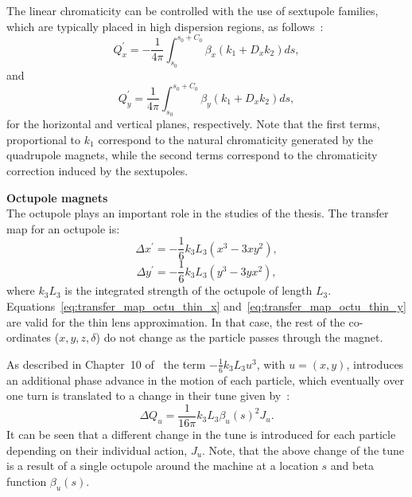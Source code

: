 The linear chromaticity can be controlled with the use of sextupole families,  which are typically placed in high dispersion regions, as follows~\cite{wolski2014}:%
\begin{equation}
    Q_x^\prime = -\frac{1}{4\pi}\int_{s_0}^{s_0+C_0}\beta_x(k_1+D_x k_2)ds,
\end{equation}
and
\begin{equation}
    Q_y^\prime = \frac{1}{4\pi}\int_{s_0}^{s_0+C_0}\beta_y(k_1+D_x k_2)ds,
\end{equation}
for the horizontal and vertical planes, respectively. Note that the first terms, proportional to $k_1$ correspond to the natural chromaticity generated by the quadrupole magnets, while the second terms correspond to the chromaticity correction induced by the sextupoles.

\textbf{Octupole magnets}\\
The octupole plays an important role in the studies of the thesis.
The transfer map for an octupole is:
\begin{equation}\label{eq:transfer_map_octu_thin_x}
   \Delta x^\prime = -\frac{1}{6}{k_3L_3}(x^3-3xy^2),
\end{equation}
\begin{equation}\label{eq:transfer_map_octu_thin_y}
    \Delta y^\prime= -\frac{1}{6}{k_3L_3}(y^3-3yx^2),
 \end{equation}
 where $k_3L_3$ is the integrated strength of the octupole of length $L_3$. Equations~\eqref{eq:transfer_map_octu_thin_x} and~\eqref{eq:transfer_map_octu_thin_y} are valid for the thin lens approximation. %
 In that case, the rest of the co-ordinates ($x,y,z,\delta$) do not change as the particle passes through the magnet.


As described in Chapter~10 of~\cite{Stoel:2693915} the term $-\frac{1}{6}k_3L_3u^3$, with $u=(x,y)$, introduces an additional phase advance in the motion of each particle, which eventually over one turn is translated to a change in their tune given by~\cite{Stoel:2693915}:
\begin{equation}\label{eq:tune_shit_octupoles}
    \Delta Q_u  = \frac{1}{16 \pi} k_3L_3\beta_u(s)^2 J_u.
\end{equation}
It can be seen that a different change in the tune is introduced for each particle depending on their individual action, $J_u$. Note, that the above change of the tune is a result of a single octupole around the machine at a location $s$ and beta function $\beta_u(s)$. %

